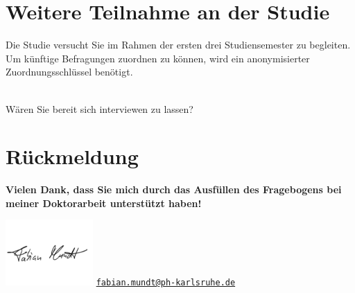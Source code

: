 
\vspace{-.25cm}
\section{Weitere Teilnahme an der Studie}
\vspace{.25cm}

\begin{choicequestion}[4]{Die Studie versucht Sie im Rahmen der ersten drei Studiensemester zu begleiten. Um künftige Befragungen zuordnen zu können, wird ein anonymisierter Zuordnungsschlüssel benötigt.}
	\\
	\\
\end{choicequestion}

\separate

\begin{choicequestion}[1]{Wären Sie bereit sich interviewen zu lassen?}
\end{choicequestion}

\vspace{.25cm}
\section{Rückmeldung}
\vspace{.25cm}



\separate

\textbf{Vielen Dank, dass Sie mich durch das Ausfüllen des Fragebogens bei meiner Doktorarbeit unterstützt haben!}

\vspace{-1.5cm}
\flushright
\includegraphics[width=0.25\textwidth]{unterschrift.png}
\vspace{-1.5cm}
\flushright
\href{mailto:fabian.mundt@ph-karlsruhe.de}{\nolinkurl{fabian.mundt@ph-karlsruhe.de}}
